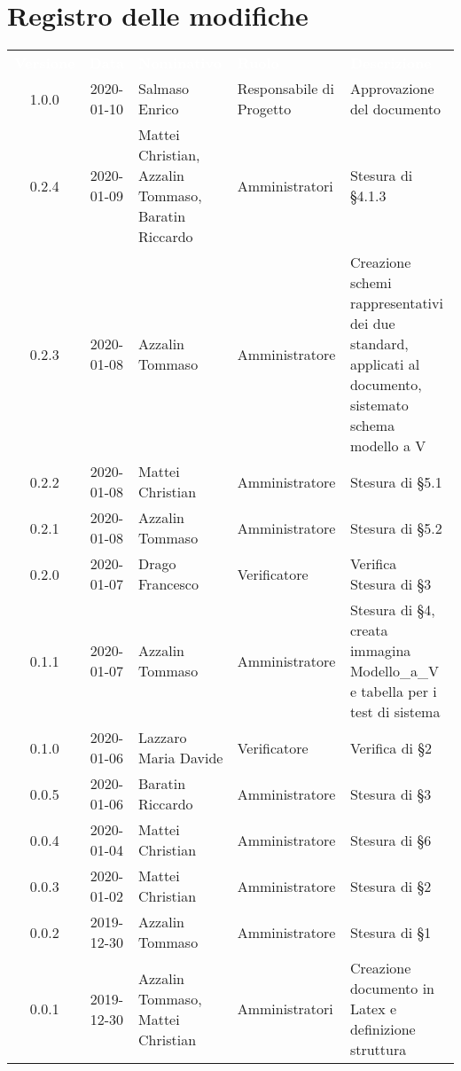 \section*{Registro delle modifiche}
{
\renewcommand{\arraystretch}{1.5}
\centering
\begin{longtable}{ c c  C{4cm}  C{3cm} C{4cm}}
\textcolor{white}{\textbf{Versione}} & \textcolor{white}{\textbf{Data}} & \textcolor{white}{\textbf{Nominativo}} & \textcolor{white}{\textbf{Ruolo}} & \textcolor{white}{\textbf{Descrizione}}\\	

1.0.0 & 2020-01-10 & Salmaso Enrico & Responsabile di Progetto & Approvazione del documento \\	

0.2.4 & 2020-01-09 & Mattei Christian, Azzalin Tommaso, Baratin Riccardo & Amministratori & Stesura di §4.1.3 \\
0.2.3 & 2020-01-08 & Azzalin Tommaso & Amministratore & Creazione schemi rappresentativi dei due standard, applicati al documento, sistemato schema modello a V \\
0.2.2 & 2020-01-08 & Mattei Christian & Amministratore & Stesura di §5.1 \\
0.2.1 & 2020-01-08 & Azzalin Tommaso & Amministratore & Stesura di §5.2 \\
0.2.0 & 2020-01-07 & Drago Francesco & Verificatore & Verifica Stesura di §3 \\
0.1.1 & 2020-01-07 & Azzalin Tommaso & Amministratore & Stesura di §4, creata immagina Modello\_a\_V e tabella per i test di sistema \\
0.1.0 & 2020-01-06 & Lazzaro Maria Davide & Verificatore & Verifica di §2 \\
0.0.5 & 2020-01-06 & Baratin Riccardo & Amministratore & Stesura di §3 \\
0.0.4 & 2020-01-04 & Mattei Christian & Amministratore & Stesura di §6 \\
0.0.3 & 2020-01-02 & Mattei Christian & Amministratore & Stesura di §2 \\
0.0.2 & 2019-12-30 & Azzalin Tommaso & Amministratore & Stesura di §1 \\
0.0.1 & 2019-12-30 & Azzalin Tommaso, Mattei Christian & Amministratori & Creazione documento in Latex e definizione struttura \\	
		
\end{longtable}
}
